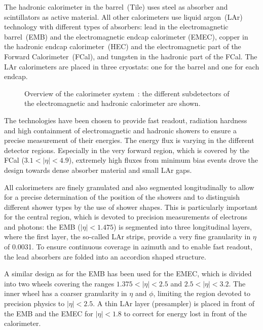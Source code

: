 The hadronic calorimeter in the barrel~(Tile) uses steel as absorber and scintillators as active material.
All other calorimeters use liquid argon~(LAr) technology with different types of absorbers:
lead in the electromagnetic barrel~(EMB) and the electromagnetic endcap calorimeter (EMEC),
copper in the hadronic endcap calorimeter~(HEC) and the electromagnetic part of the Forward Calorimeter~(FCal),
and tungsten in the hadronic part of the FCal.
The LAr calorimeters are placed in three cryostats: one for the barrel and one for each endcap.

\begin{figure}[h]
\begin{center}
\caption[Overview of the calorimeter system]{
  Overview of the calorimeter system~\cite{detectorpaper}:
  the different subdetectors of the electromagnetic and hadronic calorimeter are shown.}
\label{fig:calorimeters}
\end{center}
\end{figure}

The technologies have been chosen to provide fast readout, radiation hardness and high containment of electromagnetic and hadronic showers to ensure
a precise measurement of their energies.
The energy flux is varying in the different detector regions.
Especially in the very forward region, which is covered by the FCal (\mbox{$3.1 < |\eta| < 4.9$}), extremely high fluxes from minimum bias events
drove the design towards dense absorber material and small LAr gaps.

All calorimeters are finely granulated and also segmented longitudinally to allow for a precise determination of the position of the showers and to
distinguish different shower types by the use of shower shapes.
This is particularly important for the central region, which is devoted to precision measurements of electrons and photons:
the EMB (\mbox{$|\eta| < 1.475$}) is segmented into three longitudinal layers, where the first layer, the so-called LAr strips, provide
a very fine granularity in $\eta$ of 0.0031.
To ensure continuous coverage in azimuth and to enable fast readout, the lead absorbers are folded into an accordion shaped structure.

A similar design as for the EMB has been used for the EMEC, which is divided into two wheels covering the ranges \mbox{$1.375 < |\eta| < 2.5$}
and \mbox{$2.5 < |\eta| < 3.2$}.
The inner wheel has a coarser granularity in $\eta$ and $\phi$, limiting the region devoted to precision physics to \mbox{$|\eta| < 2.5$}.
A thin LAr layer (presampler) is placed in front of the EMB and the EMEC for \mbox{$|\eta| < 1.8$} to correct for energy lost in front of the calorimeter.

